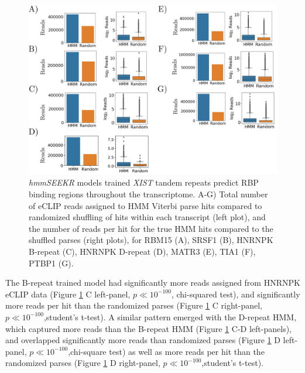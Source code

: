 \begin{figure}[h!]
\centering
\includegraphics[width=.95\textwidth]{images/transcriptomescan.pdf}
\caption[Transcriptome-wide prediction of RBP binding regions]{\emph{hmmSEEKR} models trained \emph{XIST} tandem repeats predict RBP binding regions throughout the transcriptome. A-G) Total number of eCLIP reads assigned to HMM Viterbi parse hits compared to randomized shuffling of hits within each transcript (left plot), and the number of reads per hit for the true HMM hits compared to the shuffled parses (right plots), for RBM15 (A), SRSF1 (B), HNRNPK B-repeat (C), HNRNPK D-repeat (D), MATR3 (E), TIA1 (F), PTBP1 (G).}
\label{fig:transcriptome}
\end{figure}

The B-repeat trained model had significantly more reads assigned from HNRNPK eCLIP data (Figure \ref{fig:transcriptome} C left-panel, $p\ll10^{-100}$, chi-squared test), and significantly more reads per hit than the randomized parses (Figure \ref{fig:transcriptome} C right-panel, $p\ll10^{-100}$,student's t-test). A similar pattern emerged with the D-repeat HMM, which captured more reads than the B-repeat HMM (Figure \ref{fig:transcriptome} C-D left-panels), and overlapped significantly more reads than randomized parses (Figure \ref{fig:transcriptome} D left-panel, $p\ll10^{-100}$,chi-square test) as well as more reads per hit than the randomized parses (Figure \ref{fig:transcriptome} D right-panel, $p\ll10^{-100}$,student's t-test). 

